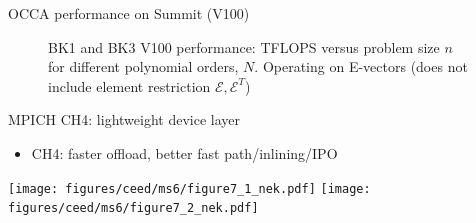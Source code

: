 \documentclass[aspectratio=169]{beamer}
\begin{document}

\begin{frame}{OCCA performance on Summit (V100)}
  \begin{figure}%
    \centering
    \caption{BK1 and BK3 V100 performance: TFLOPS versus problem size $n$ for
      different polynomial orders, $N$.  Operating on E-vectors (does not include element restriction $\mathcal E, \mathcal E^T$)}
  \end{figure}
\end{frame}


\begin{frame}{MPICH CH4: lightweight device layer}
  \begin{itemize}
  \item CH4: faster offload, better fast path/inlining/IPO
  \end{itemize}
  \texttt{[image: figures/ceed/ms6/figure7\_1\_nek.pdf]}
  \texttt{[image: figures/ceed/ms6/figure7\_2\_nek.pdf]}
\end{frame}
\end{document}
